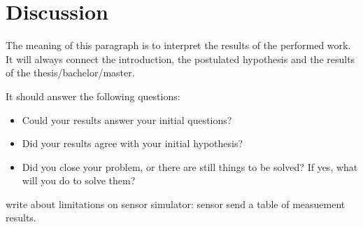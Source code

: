 \chapter{Discussion}

The meaning of this paragraph is to interpret the results of the performed work. It will always connect the introduction, the postulated hypothesis and the results of the thesis/bachelor/master.

It should answer the following questions:
\begin{itemize}
	\item Could your results answer your initial questions?
	\item Did your results agree with your initial hypothesis?
	\item Did you close your problem, or there are still things to be solved? If yes, what will you do to solve them? 
\end{itemize}

write about limitations on sensor simulator: sensor send a table of measuement results. 
